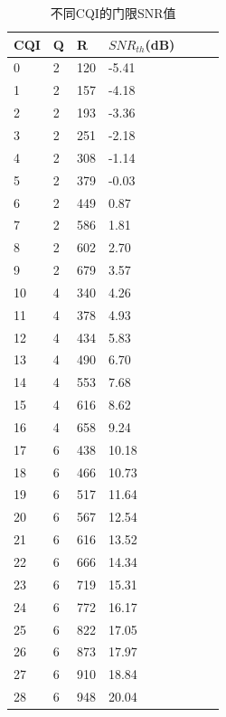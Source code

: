 \documentclass{article}
\begin{document}
\begin{table}[H]
	\caption{不同CQI的门限SNR值}
	\centering
	\begin{tabular}{|l|l|l|l|l|l|l|}%
		\hline  %
		CQI		& Q		& R		& $SNR_{th}$(dB)    \\
		\hline
		0		& 2		& 120	& -5.41 \\
		\hline
		1		& 2		& 157	& -4.18 \\
		\hline
		2		& 2		& 193	& -3.36 \\
		\hline
		3		& 2		& 251	& -2.18 \\
		\hline
		4		& 2		& 308	& -1.14 \\
		\hline
		5		& 2		& 379	& -0.03 \\
		\hline
		6		& 2		& 449	& 0.87  \\
		\hline
		7		& 2		& 586	& 1.81  \\
		\hline
		8		& 2		& 602	& 2.70  \\
		\hline
		9		& 2		& 679	& 3.57  \\
		\hline
		10		& 4		& 340	& 4.26  \\
		\hline
		11		& 4		& 378	& 4.93  \\
		\hline
		12		& 4		& 434	& 5.83  \\
		\hline
		13		& 4		& 490	& 6.70  \\
		\hline
		14		& 4		& 553	& 7.68  \\
		\hline
		15		& 4		& 616	& 8.62 \\
		\hline
		16		& 4		& 658	& 9.24 \\
		\hline
		17		& 6		& 438	& 10.18 \\
		\hline
		18		& 6		& 466	& 10.73 \\
		\hline
		19		& 6		& 517	& 11.64 \\
		\hline
		20		& 6		& 567	& 12.54 \\
		\hline
		21		& 6		& 616	& 13.52 \\
		\hline
		22		& 6		& 666	& 14.34 \\
		\hline
		23		& 6		& 719	& 15.31 \\
		\hline
		24		& 6		& 772	& 16.17 \\
		\hline
		25		& 6		& 822	& 17.05 \\
		\hline
		26		& 6		& 873	& 17.97 \\
		\hline
		27		& 6		& 910	& 18.84 \\
		\hline
		28		& 6		& 948	& 20.04 \\
		\hline  %
	\end{tabular}
\end{table}
\end{document}

